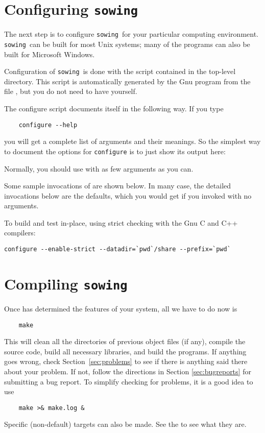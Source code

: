 \documentclass[11pt,twoside]{article}
\newcommand{\sowing}{{\tt sowing}}
\begin{document}
\section{Configuring {\tt sowing}}
\label{sec:configuring}

The next step is to configure \sowing\ for your particular computing
environment.  \sowing\ can be built for most Unix systems; many of the
programs can also be built for Microsoft Windows.

Configuration of \sowing\ is done with the  script contained in
the top-level directory.  This script is automatically generated by the Gnu
 program from the file , but you do not need
to have  yourself.

The configure script documents itself in the following way.  If you type
\begin{verbatim}
    configure --help
\end{verbatim}
you will get a complete list of arguments and their meanings.  So the
simplest way to document the options for {\tt configure} is to just show
its output here:
\bigskip


Normally, you should use  with as few arguments as you can.

Some sample invocations of  are shown below.  In many case,
the detailed invocations below are the defaults, which you would get if you
invoked  with no arguments.

To build and test in-place, using strict checking with the Gnu C and C++
compilers: 
\begin{verbatim}
configure --enable-strict --datadir=`pwd`/share --prefix=`pwd`
\end{verbatim}

\section{Compiling \sowing}
\label{sec:compiling}

Once  has determined the features of your system, all we have
to do now is 
\begin{verbatim}
    make
\end{verbatim}
This will clean all the directories of previous object files (if any), compile
the source code, build all necessary
libraries, and build the programs.  If anything goes wrong, check
Section~\ref{sec:problems} to see if there is anything said there about your
problem.  If not, follow the directions in Section \ref{sec:bugreports} for
submitting a bug report.  To simplify checking for problems, it is a good idea
to use 
\begin{verbatim}
    make >& make.log &
\end{verbatim}
Specific (non-default) targets can also be made.  See the  to
see what they are.
\end{document}
